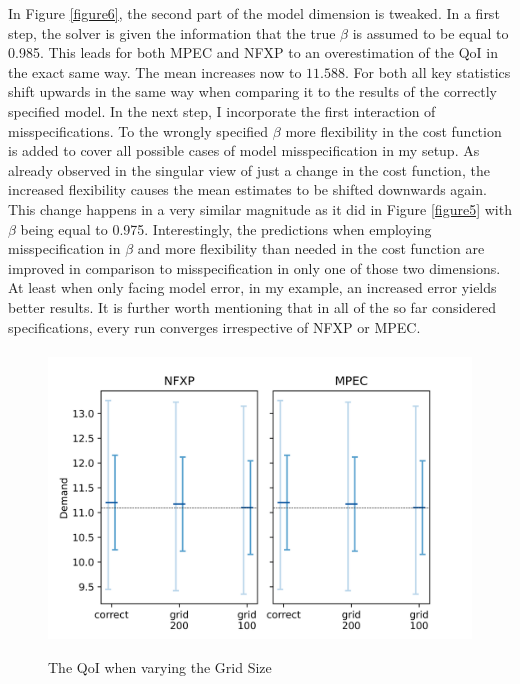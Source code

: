 In Figure \ref{figure6}, the second part of the model dimension is tweaked. In a first step, the solver is given the information that the true $\beta$ is assumed to be equal to 0.985. This leads for both MPEC and NFXP to an overestimation of the QoI in the exact same way. The mean increases now to $11.588$. For both all key statistics shift upwards in the same way when comparing it to the results of the correctly specified model. In the next step, I incorporate the first interaction of misspecifications. To the wrongly specified $\beta$ more flexibility in the cost function is added to cover all possible cases of model misspecification in my setup. As already observed in the singular view of just a change in the cost function, the increased flexibility causes the mean estimates to be shifted downwards again. This change happens in a very similar magnitude as it did in Figure \ref{figure5} with $\beta$ being equal to 0.975. Interestingly, the predictions when employing misspecification in $\beta$ and more flexibility than needed in the cost function are improved in comparison to misspecification in only one of those two dimensions. At least when only facing model error, in my example, an increased error yields better results. It is further worth mentioning that in all of the so far considered specifications, every run converges irrespective of NFXP or MPEC. \paragraph{}

\begin{figure}[!b]
	\caption{The QoI when varying the Grid Size}
	\vspace*{-4mm}
	\centering
	\includegraphics[scale=0.9]{../figures/figure_7.png}
	\label{figure7}
\end{figure}

